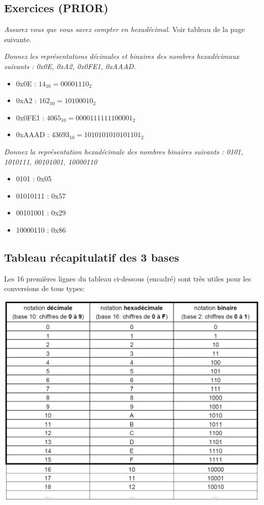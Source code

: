 \subsection{Exercices (PRIOR)}
{
\textit{Assurez vous que vous savez compter en hexadécimal.}
}
{%
Voir tableau de la page suivante.
}

{
\textit{Donnez les représentations décimales et binaires des nombres hexadécimaux suivants : 0x0E, 0xA2, 0x0FE1, 0xAAAD.}
}
{%
\begin{itemize}
\item 0x0E : $14_{10}=00001110_{2}$
\item 0xA2 : $162_{10}=10100010_{2}$
\item 0x0FE1 : $4065_{10}=0000111111100001_{2}$
\item 0xAAAD : $43693_{10}=1010101010101101_{2}$
\end{itemize}
}

{
\textit{Donnez la représentation hexadécimale des nombres binaires suivants : 0101, 1010111, 00101001, 10000110}
}
{%
\begin{itemize}
\item 0101 : 0x05
\item 01010111 : 0x57
\item 00101001 : 0x29
\item 10000110 : 0x86

\end{itemize}
}

\subsection{Tableau récapitulatif des 3 bases}
Les 16 premières lignes du tableau ci-dessous (encadré) sont très utiles pour les conversions de tous types:
\begin{center}
\includegraphics[scale=0.6]{Labo3_Tabrecap.png}
\end{center}

